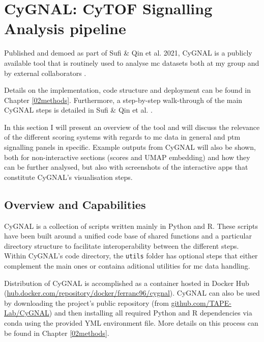 \section{CyGNAL: CyTOF Signalling Analysis pipeline}

Published and demoed as part of Sufi \& Qin et al. 2021, CyGNAL is a publicly available tool that is routinely used to analyse \acrshort{mc} datasets both at my group and by external collaborators \cite{michelozzi_activation_2023}.

Details on the implementation, code structure and deployment can be found in Chapter \ref{02methods}. Furthermore, a step-by-step walk-through of the main CyGNAL steps is detailed in Sufi \& Qin et al. \cite{sufi_multiplexed_2021}.

In this section I will present an overview of the tool and will discuss the relevance of the different scoring systems with regards to \acrshort{mc} data in general and \acrshort{ptm} signalling panels in specific. Example outputs from CyGNAL will also be shown, both for non-interactive sections (scores and UMAP embedding) and how they can be further analysed, but also with screenshots of the interactive apps that constitute CyGNAL's visualisation steps.

\subsection{Overview and Capabilities}

CyGNAL is a collection of scripts written mainly in Python and R. These scripts have been built around a unified code base of shared functions and a particular directory structure to facilitate interoperability between the different steps. 
Within CyGNAL's code directory, the \texttt{utils} folder has optional steps that either complement the main ones or containa aditional utilities for \acrshort{mc} data handling. 

Distribution of CyGNAL is accomplished as a container hosted in Docker Hub (\href{https://hub.docker.com/repository/docker/ferranc96/cygnal}{hub.docker.com/repository/docker/ferranc96/cygnal}). CyGNAL can also be used by downloading the project's public repository (from \href{github.com/TAPE-Lab/CyGNAL}{github.com/TAPE-Lab/CyGNAL}) and then installing all required Python and R dependencies via conda using the provided YML environment file. More details on this process can be found in Chapter \ref{02methods}.

